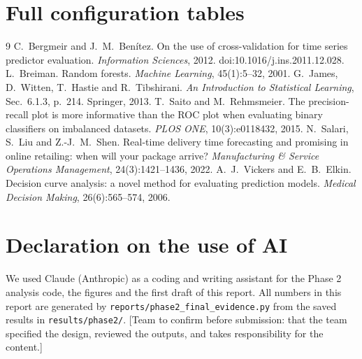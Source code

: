 \documentclass[12pt,a4paper]{article}
\begin{document}
\appendix
\section{Full configuration tables}

\label{app:regression}

\label{app:classifier}

\begin{thebibliography}{9}\small\setlength{\itemsep}{0pt}
 C.~Bergmeir and J.~M.~Ben\'itez. On the use of cross-validation for time series predictor evaluation. \emph{Information Sciences}, 2012. doi:10.1016/j.ins.2011.12.028.
 L.~Breiman. Random forests. \emph{Machine Learning}, 45(1):5--32, 2001.
 G.~James, D.~Witten, T.~Hastie and R.~Tibshirani. \emph{An Introduction to Statistical Learning}, Sec.~6.1.3, p.~214. Springer, 2013.
 T.~Saito and M.~Rehmsmeier. The precision-recall plot is more informative than the ROC plot when evaluating binary classifiers on imbalanced datasets. \emph{PLOS ONE}, 10(3):e0118432, 2015.
 N.~Salari, S.~Liu and Z.-J.~M.~Shen. Real-time delivery time forecasting and promising in online retailing: when will your package arrive? \emph{Manufacturing \& Service Operations Management}, 24(3):1421--1436, 2022.
 A.~J.~Vickers and E.~B.~Elkin. Decision curve analysis: a novel method for evaluating prediction models. \emph{Medical Decision Making}, 26(6):565--574, 2006.
\end{thebibliography}

\section*{Declaration on the use of AI}
We used Claude (Anthropic) as a coding and writing assistant for the Phase 2 analysis code, the figures and the first draft of this report. All numbers in this report are generated by \texttt{reports/phase2\_final\_evidence.py} from the saved results in \texttt{results/phase2/}. [Team to confirm before submission: that the team specified the design, reviewed the outputs, and takes responsibility for the content.]
\end{document}
